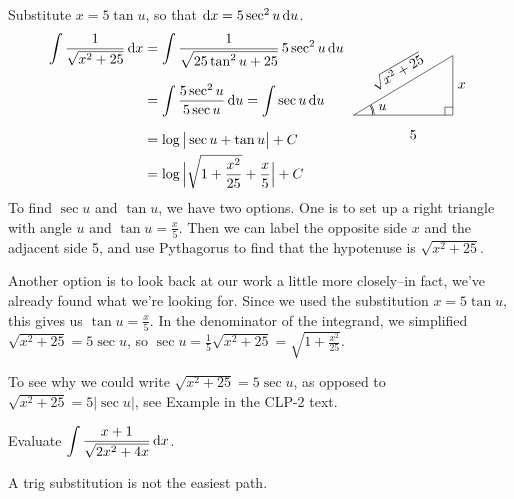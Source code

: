 \begin{solution} 
Substitute $x=5\tan u$, so that $\mathrm{d}x=5 \sec^2u\,\mathrm{d}u$.
\begin{align*}
\int\frac{1}{\sqrt{x^2+25}}\,\dee{x}
&=\int \frac{1}{\sqrt{25\tan^2 u+25}}\,5\sec^2 u\,\dee{u}   \\[0.1in]
&=\int \frac{5\sec^2u}{5\sec u}\,\dee{u}
=\int \sec u\,\dee{u} \\[0.1in]
&= \log\big|\sec u+\tan u\big|+C
\qquad\qquad\smash{
\trigtri{u}{5}{x}{\sqrt{x^2+25}}} \\
&= \log\Big|\sqrt{1+\frac{x^2}{25}}+\frac{x}{5}\Big|+C
\end{align*}
To find $\sec u$ and $\tan u$, we have two options. One is to set up a right triangle with angle $u$ and $\tan u = \frac{x}{5}$. Then we can label the opposite side $x$ and the adjacent side 5, and use Pythagorus to find that the hypotenuse is $\sqrt{x^2+25}$.

Another option is to look back at our work a little more closely--in fact, we've already found what we're looking for. Since we used the substitution $x=5\tan u$, this gives us $\tan u = \frac{x}{5}$. In the denominator of the integrand, we simplified $\sqrt{x^2+25} = 5\sec u$, so $\sec u = \frac{1}{5}\sqrt{x^2+25} = \sqrt{1+\frac{x^2}{25}}$.

To see why we could write $\sqrt{x^2+25} =5\sec u$, as opposed to 
$\sqrt{x^2+25} =5|\sec u|$,  see
Example  in the CLP-2 text.


\end{solution}
\begin{question}
Evaluate $\displaystyle\int\frac{x+1}{\sqrt{2x^2+4x}}
\, \mathrm{d}x$.
\end{question}
\begin{hint}
A trig substitution is not the easiest path.
\end{hint}
